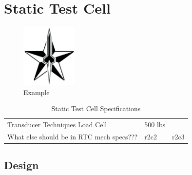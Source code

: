 \documentclass[10pt,a4paper]{article}
\begin{document}
	
\section{Static Test Cell}

\begin{figure}[h!]
	\centering
	\includegraphics[width=0.25\textwidth]{./figs/logo_srt.png}
	\caption{Example}
	\label{fig:example}
\end{figure}


\begin{table}[h!]
		\centering
		\begin{tabular}{l l l}
			Transducer Techniques Load Cell & 500 lbs &  \\
			What else should be in RTC mech specs??? & r2c2 & r2c3 \\
		\end{tabular}
		\caption{Static Test Cell Specifications}
		\label{tab:example}
\end{table}
\subsection{Design}
\end{document}
